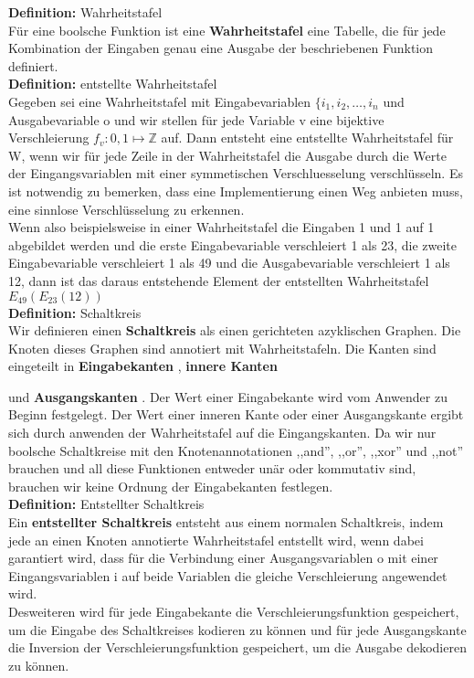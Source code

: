 \documentclass{article}
\newenvironment{definition}
    [1]
    {
        {\bf Definition:} #1\\
    }
    {}
\newcommand{\defined}
    [1]
    {
        {\bf #1}
    }
\begin{document}
\begin{definition}{Wahrheitstafel}
F\"ur eine boolsche Funktion ist eine \defined{Wahrheitstafel} eine Tabelle,
die f\"ur jede Kombination der Eingaben genau eine Ausgabe der beschriebenen
Funktion definiert.
\end{definition}\\
\begin{definition}{entstellte Wahrheitstafel}
Gegeben sei eine Wahrheitstafel mit Eingabevariablen 
\(\{i_1, i_2, \dots, i_n\) und Ausgabevariable o und wir 
 stellen f\"ur jede Variable v eine bijektive
 Verschleierung \(f_v : {0, 1} \mapsto \mathbb{Z}\) auf. 
Dann entsteht eine entstellte Wahrheitstafel f\"ur W, wenn
 wir f\"ur jede Zeile in der Wahrheitstafel die Ausgabe
 durch die Werte der Eingangsvariablen mit einer symmetischen
 Verschluesselung verschl\"usseln.
Es ist notwendig zu bemerken, dass eine Implementierung
 einen Weg anbieten muss, eine sinnlose Verschl\"usselung
 zu erkennen.\\
Wenn also beispielsweise in einer Wahrheitstafel die Eingaben 
 1 und 1 auf 1 abgebildet werden und die erste Eingabevariable
 verschleiert 1 als 23, die zweite Eingabevariable verschleiert
 1 als 49 und die Ausgabevariable verschleiert 1 als 12, dann
 ist das daraus entstehende Element der entstellten Wahrheitstafel
 \(E_{49}(E_{23}(12))\)
\end{definition}\\
\begin{definition}{Schaltkreis}
Wir definieren einen \defined{Schaltkreis} als einen gerichteten azyklischen 
 Graphen.
Die Knoten dieses Graphen sind annotiert mit Wahrheitstafeln. 
Die Kanten sind eingeteilt in \defined{Eingabekanten}, \defined{innere Kanten} 
 und \defined{Ausgangskanten}.
Der Wert einer Eingabekante wird vom Anwender zu Beginn festgelegt. 
Der Wert einer inneren Kante oder einer Ausgangskante ergibt sich durch
 anwenden der Wahrheitstafel auf die Eingangskanten. 
Da wir nur boolsche Schaltkreise mit den Knotenannotationen ,,and'',
 ,,or'', ,,xor'' und ,,not'' brauchen und all diese Funktionen entweder
 un\"ar oder kommutativ sind, brauchen wir keine Ordnung der Eingabekanten
 festlegen.
\end{definition}\\
\begin{definition}{Entstellter Schaltkreis}
Ein \defined{entstellter Schaltkreis} entsteht aus einem normalen Schaltkreis,
 indem jede an einen Knoten annotierte Wahrheitstafel entstellt wird, wenn
 dabei garantiert wird, dass f\"ur die Verbindung einer Ausgangsvariablen
 o mit einer Eingangsvariablen i auf beide Variablen die gleiche
 Verschleierung angewendet wird.\\
Desweiteren wird f\"ur jede Eingabekante die Verschleierungsfunktion
 gespeichert, um die Eingabe des Schaltkreises kodieren zu k\"onnen und
 f\"ur jede Ausgangskante die Inversion der Verschleierungsfunktion
 gespeichert, um die Ausgabe dekodieren zu k\"onnen.
\end{definition}
\end{document}
